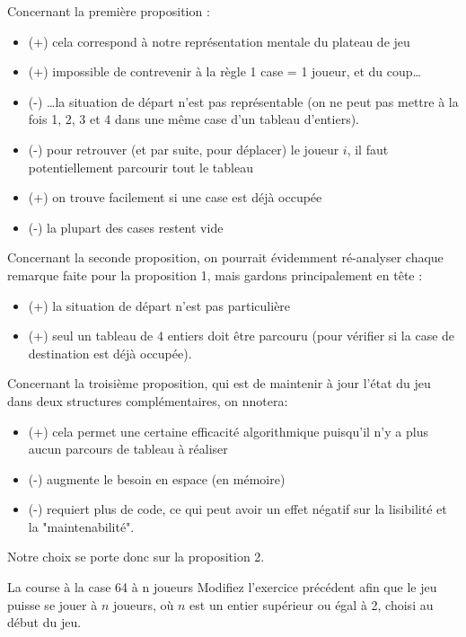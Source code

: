 \begin{Solution}
  Concernant la première proposition :
  \begin{itemize}
  \item (+) cela correspond à notre représentation mentale du plateau de jeu
  \item (+) impossible de contrevenir à la règle 1 case = 1 joueur, et du coup\dots
  \item (-) \dots la situation de départ n'est pas représentable (on ne peut pas mettre à la fois 1, 2, 3 et 4 dans une même case d'un tableau d'entiers).
  \item (-) pour retrouver (et par suite, pour déplacer) le joueur $i$, il faut potentiellement parcourir tout le tableau
  \item (+) on trouve facilement si une case est déjà occupée
  \item (-) la plupart des cases restent vide
  \end{itemize}
  Concernant la seconde proposition, on pourrait évidemment ré-analyser chaque remarque faite pour la proposition 1, mais gardons principalement en tête :
  \begin{itemize}
  \item (+) la situation de départ n'est pas particulière
  \item (+) seul un tableau de 4 entiers doit être parcouru (pour vérifier si la case de destination est déjà occupée).
  \end{itemize}
  Concernant la troisième proposition, qui est de maintenir à jour l'état du jeu dans deux structures complémentaires, on nnotera:
  \begin{itemize}
  \item (+) cela permet une certaine efficacité algorithmique puisqu'il n'y a plus aucun parcours de tableau à réaliser
  \item (-) augmente le besoin en espace (en mémoire)
  \item (-) requiert plus de code, ce qui peut avoir un effet négatif sur la lisibilité et la "maintenabilité".
  \end{itemize}
  Notre choix se porte donc sur la proposition 2.
\end{Solution}

\begin{Exercice}{La course à la case 64 à n joueurs}
	Modifiez l'exercice précédent 
	afin que le jeu puisse se jouer à $n$ joueurs,
	où $n$ est un entier supérieur ou égal à 2, choisi au début du jeu.
\end{Exercice}
	
